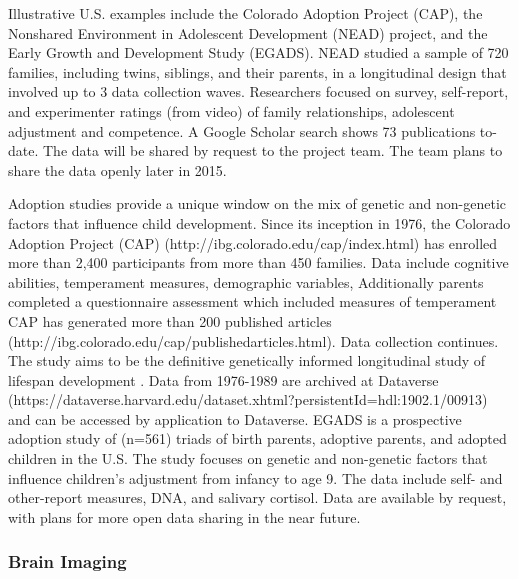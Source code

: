 \documentclass[letterpaper,man,apacite]{apa6}
\begin{document}
Illustrative U.S. examples include the Colorado Adoption Project (CAP), the Nonshared Environment in Adolescent Development (NEAD) project, and the Early Growth and Development Study (EGADS).
NEAD studied a sample of 720 families, including twins, siblings, and their parents, in a longitudinal design that involved up to 3 data collection waves.
Researchers focused on survey, self-report, and experimenter ratings (from video) of family relationships, adolescent adjustment and competence.
A Google Scholar search shows 73 publications to-date.
The data will be shared by request to the project team.
The team plans to share the data openly later in 2015.

Adoption studies provide a unique window on the mix of genetic and non-genetic factors that influence child development.
Since its inception in 1976, the Colorado Adoption Project (CAP) (http://ibg.colorado.edu/cap/index.html) has enrolled more than 2,400 participants from more than 450 families.
Data include cognitive abilities, temperament measures, demographic variables, 
Additionally parents completed a questionnaire assessment which included measures of temperament
CAP has generated more than 200 published articles (http://ibg.colorado.edu/cap/publishedarticles.html).
Data collection continues.
The study aims to be the definitive genetically informed longitudinal study of lifespan development \cite{rhea_colorado_2013}.
Data from 1976-1989 are archived at Dataverse (https://dataverse.harvard.edu/dataset.xhtml?persistentId=hdl:1902.1/00913) and can be accessed by application to Dataverse.
EGADS is a prospective adoption study of (n=561) triads of birth parents, adoptive parents, and adopted children in the U.S. 
The study focuses on genetic and non-genetic factors that influence children’s adjustment from infancy to age 9. 
The data include self- and other-report measures, DNA, and salivary cortisol.
Data are available by request, with plans for more open data sharing in the near future.

\subsubsection{Brain Imaging}
\end{document}
